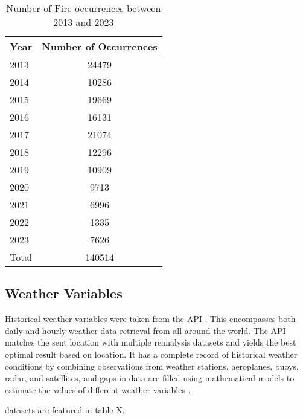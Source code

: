 \begin{table}[H]
	\centering
	\caption{Number of Fire occurrences between 2013 and 2023}
	\label{number_occurrences_2013_2023}
	\begin{tabular}{lc}
		Year  & \multicolumn{1}{l}{Number of Occurrences} \\ \hline
		2013  & 24479                                     \\
		2014  & 10286                                     \\
		2015  & 19669                                     \\
		2016  & 16131                                     \\
		2017  & 21074                                     \\
		2018  & 12296                                     \\
		2019  & 10909                                     \\
		2020  & 9713                                      \\
		2021  & 6996                                      \\
		2022  & 1335                                      \\
		2023  & 7626                                      \\ \hline
		Total & 140514                                    \\ \hline
	\end{tabular}
\end{table}



\subsection{Weather Variables}
Historical weather variables were taken from the API \cite{Zippenfenig_Open-Meteo}. This encompasses both daily and hourly weather data retrieval from all around the world. The API matches the sent location with multiple reanalysis datasets and yields the best optimal result based on location. It has a complete record of historical weather conditions by combining observations from weather stations, aeroplanes, buoys, radar, and satellites, and gaps in data are filled using mathematical models to estimate the values of different weather variables \cite{Zippenfenig_Open-Meteo}.

\cite{Zippenfenig_Open-Meteo} datasets are featured in table X.





